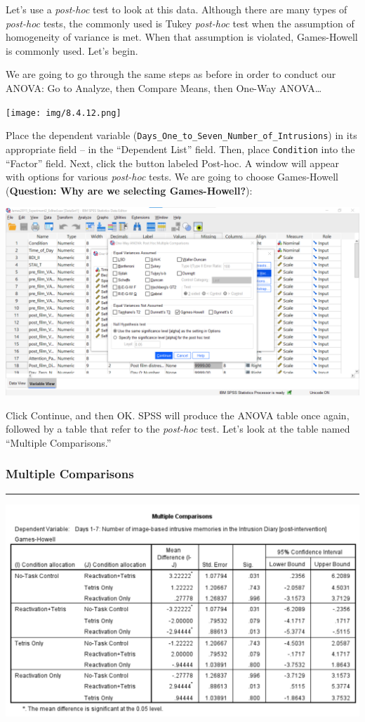 \documentclass[
]{book}
\begin{document}
Let's use a \emph{post-hoc} test to look at this data. Although there are many types of \emph{post-hoc} tests, the commonly used is Tukey \emph{post-hoc} test when the assumption of homogeneity of variance is met. When that assumption is violated, Games-Howell is commonly used. Let's begin.

We are going to go through the same steps as before in order to conduct our ANOVA: Go to {Analyze}, then {Compare Means}, then {One-Way ANOVA\ldots{}}

\texttt{[image: img/8.4.12.png]}

Place the dependent variable (\texttt{Days\_One\_to\_Seven\_Number\_of\_Intrusions}) in its appropriate field -- in the ``Dependent List'' field. Then, place \texttt{Condition} into the ``Factor'' field. Next, click the button labeled {Post-hoc}. A window will appear with options for various \emph{post-hoc} tests. We are going to choose {Games-Howell} (\textbf{Question: Why are we selecting Games-Howell?}):

\includegraphics{img/8.6.5.33.png}

Click {Continue}, and then {OK}. SPSS will produce the ANOVA table once again, followed by a table that refer to the \emph{post-hoc} test. Let's look at the table named ``Multiple Comparisons.''

\hypertarget{multiple-comparisons}{%
\subsubsection{Multiple Comparisons}\label{multiple-comparisons}}

\begin{center}\rule{0.5\linewidth}{0.5pt}\end{center}

\includegraphics{img/8.6.5.34.png}
\end{document}
